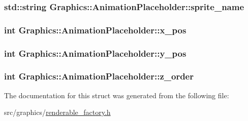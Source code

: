 \subsubsection[{sprite\+\_\+name}]{\setlength{\rightskip}{0pt plus 5cm}std\+::string Graphics\+::\+Animation\+Placeholder\+::sprite\+\_\+name}\label{struct_graphics_1_1_animation_placeholder_aa6d0960d3bf182a8ce0047c2c2a180ed}
\hypertarget{struct_graphics_1_1_animation_placeholder_aed910a3665ceb34c24ea8daaac2b8d6f}{}
\subsubsection[{x\+\_\+pos}]{\setlength{\rightskip}{0pt plus 5cm}int Graphics\+::\+Animation\+Placeholder\+::x\+\_\+pos}\label{struct_graphics_1_1_animation_placeholder_aed910a3665ceb34c24ea8daaac2b8d6f}
\hypertarget{struct_graphics_1_1_animation_placeholder_ad65e0d16937e548f1a4cc09c1d6e973a}{}
\subsubsection[{y\+\_\+pos}]{\setlength{\rightskip}{0pt plus 5cm}int Graphics\+::\+Animation\+Placeholder\+::y\+\_\+pos}\label{struct_graphics_1_1_animation_placeholder_ad65e0d16937e548f1a4cc09c1d6e973a}
\hypertarget{struct_graphics_1_1_animation_placeholder_acc9e536b7002c04adc264abf55d51225}{}
\subsubsection[{z\+\_\+order}]{\setlength{\rightskip}{0pt plus 5cm}int Graphics\+::\+Animation\+Placeholder\+::z\+\_\+order}\label{struct_graphics_1_1_animation_placeholder_acc9e536b7002c04adc264abf55d51225}


The documentation for this struct was generated from the following file\+:\begin{DoxyCompactItemize}
\item 
src/graphics/\hyperlink{renderable__factory_8h}{renderable\+\_\+factory.\+h}\end{DoxyCompactItemize}
